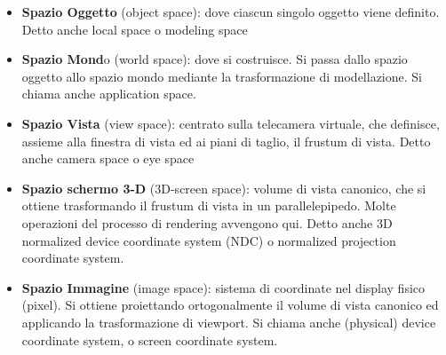 \documentclass[a4paper, 10pt]{article}
\begin{document}
	\begin{itemize}
		\item \textbf{Spazio Oggetto} (object space): dove ciascun singolo oggetto viene
		definito. Detto anche local space o modeling space
		\item \textbf{Spazio Mond}o (world space): dove si costruisce. Si passa dallo spazio
		oggetto allo spazio mondo mediante la trasformazione di modellazione.
		Si chiama anche application space.
		\item \textbf{Spazio Vista} (view space): centrato sulla telecamera virtuale, che
		definisce, assieme alla finestra di vista ed ai piani di taglio, il frustum di
		vista. Detto anche camera space o eye space
		\item \textbf{Spazio schermo 3-D} (3D-screen space): volume di vista canonico, che si
		ottiene trasformando il frustum di vista in un parallelepipedo. Molte
		operazioni del processo di rendering avvengono qui. Detto anche 3D
		normalized device coordinate system (NDC) o normalized projection
		coordinate system.
		\item \textbf{Spazio Immagine} (image space): sistema di coordinate nel display fisico
		(pixel). Si ottiene proiettando ortogonalmente il volume di vista
		canonico ed applicando la trasformazione di viewport. Si chiama anche
		(physical) device coordinate system, o screen coordinate system.
	\end{itemize}
%	
%	
	
\end{document}
